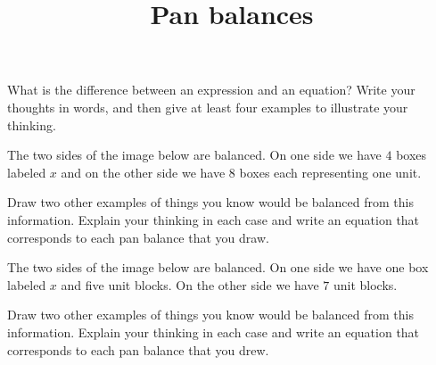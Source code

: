 \documentclass[nooutcomes,noauthor]{ximera}
\title{Pan balances}
\begin{document}
\begin{abstract}
\end{abstract}

\maketitle

\begin{problem}
What is the difference between an expression and an equation? Write your thoughts in words, and then give at least four examples to illustrate your thinking. 
\end{problem}




\begin{problem}
The two sides of the image below are balanced. On one side we have $4$ boxes labeled $x$ and on the other side we have $8$ boxes each representing one unit.
\begin{image}
\end{image}

Draw two other examples of things you know would be balanced from this information. Explain your thinking in each case and write an equation that corresponds to each pan balance that you draw. 
\end{problem}



\begin{problem}
The two sides of the image below are balanced. On one side we have one box labeled $x$ and five unit blocks. On the other side we have $7$ unit blocks.
\begin{image}
\end{image}

Draw two other examples of things you know would be balanced from this information. Explain your thinking in each case and write an equation that corresponds to each pan balance that you drew. 
\end{problem}
\end{document}
